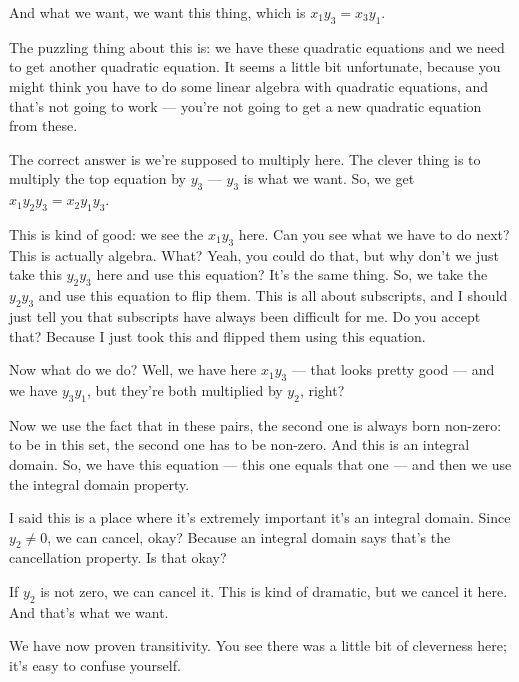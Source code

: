 \begin{speech}[00:47:20 - 00:48:40]
And what we want,  we want this thing, which is $x_1 y_3 = x_3 y_1$. 

The puzzling thing about this is: we have these quadratic equations and we need to get another quadratic equation. It seems a little bit unfortunate, because you might think you have to do some linear algebra with quadratic equations, and that's not going to work --- you're not going to get a new quadratic equation from these.

The correct answer is we're supposed to multiply here. The clever thing is to multiply the top equation by $y_3$  --- $y_3$ is what we want. So, we get $x_1 y_2 y_3 = x_2 y_1 y_3$. 

This is kind of good: we see the $x_1 y_3$ here. Can you see what we have to do next? This is actually algebra. What?
Yeah, you could do that, but why don't we just take this $y_2 y_3$ here and use this equation? It's the same thing. So, we take the $y_2 y_3$ and use this equation to flip them. This is all about subscripts, and I should just tell you that subscripts have always been difficult for me. Do you accept that? Because I just took this and flipped them using this equation. 
\end{speech}

\begin{speech}[00:48:40 - 00:50:02]
Now what do we do? Well, we have here $x_1 y_3$ --- that looks pretty good --- and we have $y_3 y_1$, but they're both multiplied by $y_2$, right?

Now we use the fact that in these pairs, the second one is always born non-zero: to be in this set, the second one has to be non-zero. And this is an integral domain. So, we have this equation --- this one equals that one --- and then we use the integral domain property. 

I said this is a place where it's extremely important it's an integral domain. Since $y_2 \neq 0$,  we can cancel,  okay? Because an integral domain says that's the cancellation property. Is that okay?

If $y_2$ is not zero, we can cancel it. This is kind of dramatic, but we cancel it here.  And that's what we want.

We have now proven transitivity. You see there was a little bit of cleverness here; it's easy to confuse yourself.
\end{speech}

